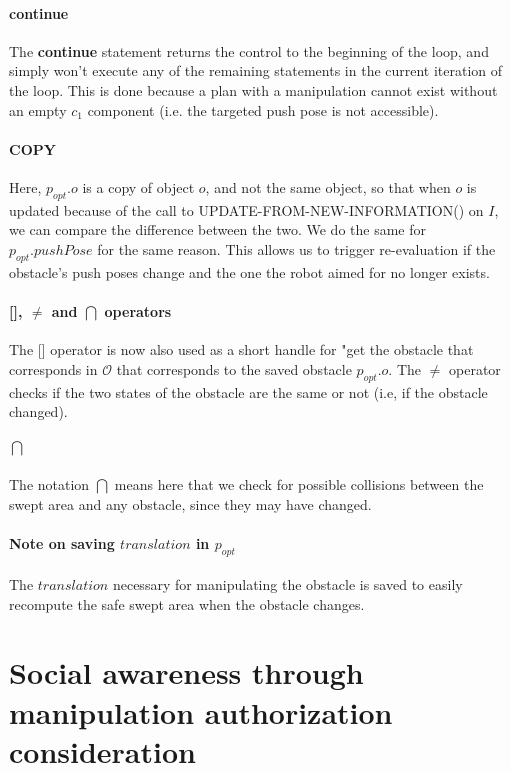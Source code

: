 \paragraph{\textbf{continue}}\label{continue_note} The \textbf{continue} statement returns the control to the beginning of the loop, and simply won't execute any of the remaining statements in the current iteration of the loop. This is done because a plan with a manipulation cannot exist without an empty $c_{1}$ component (i.e. the targeted push pose is not accessible).

\paragraph{COPY}\label{copy_note} Here, $p_{opt}.o$ is a copy of object $o$, and not the same object, so that when $o$ is updated because of the call to UPDATE-FROM-NEW-INFORMATION() on $I$, we can compare the difference between the two. We do the same for $p_{opt}.pushPose$ for the same reason. This allows us to trigger re-evaluation if the obstacle's push poses change and the one the robot aimed for no longer exists.

\paragraph{[], $\neq$ and $\bigcap$ operators}\label{operators_note} The [] operator is now also used as a short handle for "get the obstacle that corresponds in $\mathcal{O}$ that corresponds to the saved obstacle $p_{opt}.o$. The $\neq$ operator checks if the two states of the obstacle are the same or not (i.e, if the obstacle changed).

\paragraph{$\bigcap$}\label{area_intersect_note} The notation $\bigcap$ means here that we check for possible collisions between the swept area and any obstacle, since they may have changed.

\paragraph{Note on saving $translation$ in $p_{opt}$}\label{translation_note} The $translation$ necessary for manipulating the obstacle is saved to easily recompute the safe swept area when the obstacle changes.

\section{Social awareness through manipulation authorization consideration}\label{social_authorization_section}

